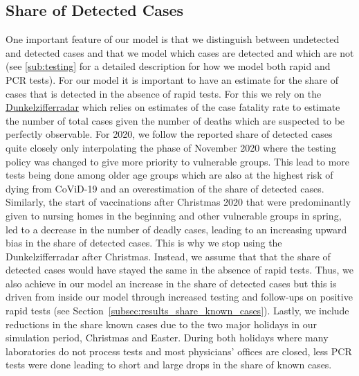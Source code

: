 \subsection{Share of Detected Cases}
\label{subsec:data_share_known_cases}


One important feature of our model is that we distinguish between undetected and detected
cases and that we model which cases are detected and which are not (see \ref{sub:testing}
for a detailed description for how we model both rapid and PCR tests). For our model it
is important to have an estimate for the share of cases that is detected in the absence
of rapid tests. For this we rely on the
\href{https://covid19.dunkelzifferradar.de/}{Dunkelzifferradar} which relies on estimates
of the case fatality rate to estimate the number of total cases given the number of
deaths which are suspected to be perfectly observable. For 2020, we follow the reported
share of detected cases quite closely only interpolating the phase of November 2020 where
the testing policy was changed to give more priority to vulnerable groups. This lead to
more tests being done among older age groups which are also at the highest risk of dying
from CoViD-19 and an overestimation of the share of detected cases.
Similarly, the start of vaccinations after Christmas 2020 that were predominantly given
to nursing homes in the beginning and other vulnerable groups in spring, led to a
decrease in the number of deadly cases, leading to an increasing upward bias in the share
of detected cases. This is why we stop using the Dunkelzifferradar after Christmas.
Instead, we assume that that the share of detected cases would have stayed the same in
the absence of rapid tests. Thus, we also achieve in our model an increase in the share
of detected cases but this is driven from inside our model through increased testing and
follow-ups on positive rapid tests (see Section~\ref{subsec:results_share_known_cases}).
Lastly, we include reductions in the share known cases due to the two major holidays in
our simulation period, Christmas and Easter. During both holidays where many laboratories
do not process tests and most physicians' offices are closed, less PCR tests were done
leading to short and large drops in the share of known cases.

